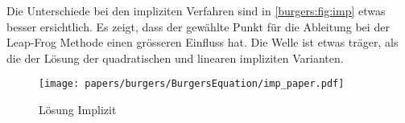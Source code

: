 	Die Unterschiede bei den impliziten Verfahren sind in \autoref{burgers:fig:imp} etwas besser ersichtlich.
	Es zeigt, dass der gew\"ahlte Punkt f\"ur die Ableitung bei der Leap-Frog Methode einen gr\"osseren Einfluss hat.
	Die Welle ist etwas tr\"ager, als die der L\"osung der quadratischen und linearen impliziten Varianten.

    \begin{figure}
	\centering
	\texttt{[image: papers/burgers/BurgersEquation/imp\_paper.pdf]}
	\caption{L\"osung Implizit}
	\label{burgers:fig:imp}
	\end{figure}

\newpage %
